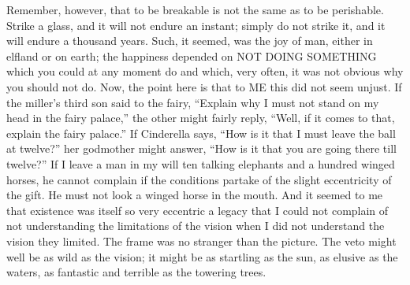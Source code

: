 Remember, however, that to be breakable is not the same as to be perishable. Strike a glass, and it will not endure an instant; simply do not strike it, and it will endure a thousand years. Such, it seemed, was the joy of man, either in elfland or on earth; the happiness depended on NOT DOING SOMETHING which you could at any moment do and which, very often, it was not obvious why you should not do. Now, the point here is that to ME this did not seem unjust. If the miller’s third son said to the fairy, “Explain why I must not stand on my head in the fairy palace,” the other might fairly reply, “Well, if it comes to that, explain the fairy palace.” If Cinderella says, “How is it that I must leave the ball at twelve?” her godmother might answer, “How is it that you are going there till twelve?” If I leave a man in my will ten talking elephants and a hundred winged horses, he cannot complain if the conditions partake of the slight eccentricity of the gift. He must not look a winged horse in the mouth. And it seemed to me that existence was itself so very eccentric a legacy that I could not complain of not understanding the limitations of the vision when I did not understand the vision they limited. The frame was no stranger than the picture. The veto might well be as wild as the vision; it might be as startling as the sun, as elusive as the waters, as fantastic and terrible as the towering trees.

